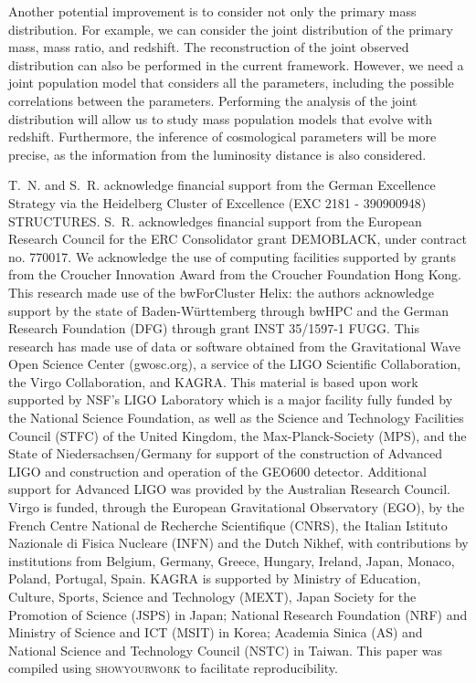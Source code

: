 \documentclass[sn-aps, pdflatex, iicol]{sn-jnl}
\begin{document}
Another potential improvement is to consider not only the primary mass distribution.
For example, we can consider the joint distribution of the primary mass, mass ratio, and redshift.
The reconstruction of the joint observed distribution can also be performed in the current framework.
However, we need a joint population model that considers all the parameters, including the possible correlations between the parameters.
Performing the analysis of the joint distribution will allow us to study mass population models that evolve with redshift.
Furthermore, the inference of cosmological parameters will be more precise, as the information from the luminosity distance is also considered.

\backmatter


T.~N. and S.~R. acknowledge financial support from the German Excellence Strategy via the Heidelberg Cluster of Excellence (EXC 2181 - 390900948) STRUCTURES.
S.~R. acknowledges financial support from the European Research Council for the ERC Consolidator grant DEMOBLACK, under contract no. 770017. 
We acknowledge the use of computing facilities supported by grants from the Croucher Innovation Award from the Croucher Foundation Hong Kong.
This research made use of the bwForCluster Helix: the authors acknowledge support by the state of Baden-Württemberg through bwHPC and the German Research Foundation (DFG) through grant INST 35/1597-1 FUGG.
This research has made use of data or software obtained from the Gravitational Wave Open Science Center (gwosc.org), a service of the LIGO Scientific Collaboration, the Virgo Collaboration, and KAGRA. This material is based upon work supported by NSF's LIGO Laboratory which is a major facility fully funded by the National Science Foundation, as well as the Science and Technology Facilities Council (STFC) of the United Kingdom, the Max-Planck-Society (MPS), and the State of Niedersachsen/Germany for support of the construction of Advanced LIGO and construction and operation of the GEO600 detector. Additional support for Advanced LIGO was provided by the Australian Research Council. Virgo is funded, through the European Gravitational Observatory (EGO), by the French Centre National de Recherche Scientifique (CNRS), the Italian Istituto Nazionale di Fisica Nucleare (INFN) and the Dutch Nikhef, with contributions by institutions from Belgium, Germany, Greece, Hungary, Ireland, Japan, Monaco, Poland, Portugal, Spain. KAGRA is supported by Ministry of Education, Culture, Sports, Science and Technology (MEXT), Japan Society for the Promotion of Science (JSPS) in Japan; National Research Foundation (NRF) and Ministry of Science and ICT (MSIT) in Korea; Academia Sinica (AS) and National Science and Technology Council (NSTC) in Taiwan.
This paper was compiled using \textsc{showyourwork} \cite{Luger2021} to facilitate reproducibility.


\end{document}
